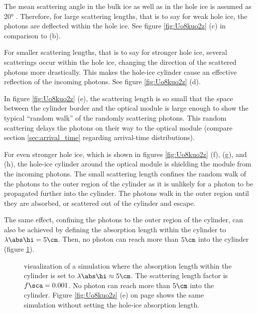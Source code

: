 The mean scattering angle in the bulk ice as well as in the hole ice is assumed as \ang{20} \cite{escawiki}. Therefore, for large scattering lengths, that is to say for weak hole ice, the photons are deflected within the hole ice. See figure \ref{fig:Uo8kuo2z} (c) in comparison to (b).

For smaller scattering lengths, that is to say for stronger hole ice, several scatterings occur within the hole ice, changing the direction of the scattered photons more drastically. This makes the hole-ice cylinder cause an effective reflection of the incoming photons. See figure \ref{fig:Uo8kuo2z} (d).

In figure \ref{fig:Uo8kuo2z} (e), the scattering length is so small that the space between the cylinder border and the optical module is large enough to show the typical ``random walk'' \cite{randomwalk} of the randomly scattering photons. This random scattering delays the photons on their way to the optical module (compare section \ref{sec:arrival_time} regarding arrival-time distributions).

For even stronger hole ice, which is shown in figures \ref{fig:Uo8kuo2z} (f), (g), and (h), the hole-ice cylinder around the optical module is shielding the module from the incoming photons. The small scattering length confines the random walk of the photons to the outer region of the cylinder as it is unlikely for a photon to be propagated further into the cylinder. The photons walk in the outer region until they are absorbed, or scattered out of the cylinder and escape.

The same effect, confining the photons to the outer region of the cylinder, can also be achieved by defining the absorption length within the cylinder to $\lambda\abs\hi = 5\cm$. Then, no photon can reach more than $5\cm$ into the cylinder (figure \ref{fig:Lie7laxa}).

\begin{figure}[htbp]
  \caption{\steamshovel visualization of a simulation where the absorption length within the cylinder is set to $\lambda\abs\hi \approx 5\cm$. The scattering length factor is $f\sca=0.001$. No photon can reach more than $5\cm$ into the cylinder. Figure \ref{fig:Uo8kuo2z} (e) on page \pageref{fig:Uo8kuo2z} shows the same simulation without setting the hole-ice absorption length.}
  \label{fig:Lie7laxa}
\end{figure}


